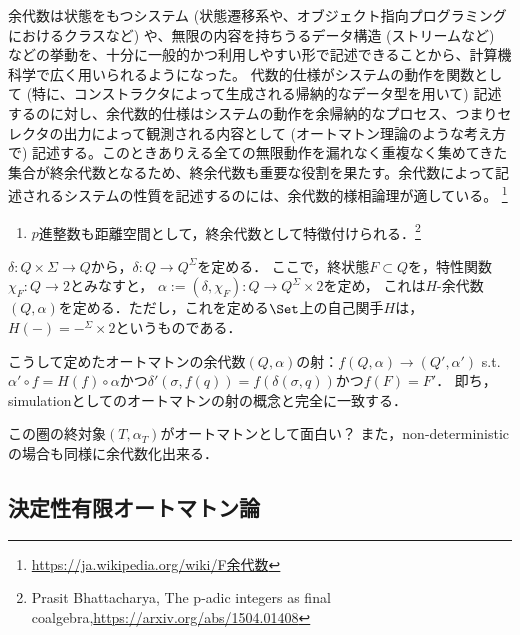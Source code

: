 \begin{example}[余代数の例]
    余代数は状態をもつシステム (状態遷移系や、オブジェクト指向プログラミングにおけるクラスなど) や、無限の内容を持ちうるデータ構造 (ストリームなど) などの挙動を、十分に一般的かつ利用しやすい形で記述できることから、計算機科学で広く用いられるようになった。
    代数的仕様がシステムの動作を関数として (特に、コンストラクタによって生成される帰納的なデータ型を用いて) 記述するのに対し、余代数的仕様はシステムの動作を余帰納的なプロセス、つまりセレクタの出力によって観測される内容として (オートマトン理論のような考え方で) 記述する。このときありえる全ての無限動作を漏れなく重複なく集めてきた集合が終余代数となるため、終余代数も重要な役割を果たす。余代数によって記述されるシステムの性質を記述するのには、余代数的様相論理が適している。 
    \footnote{\url{https://ja.wikipedia.org/wiki/F余代数}}
    \begin{enumerate}
        \item $p$進整数も距離空間として，終余代数として特徴付けられる．\footnote{Prasit Bhattacharya, The p-adic integers as final coalgebra,\url{https://arxiv.org/abs/1504.01408}}
    \end{enumerate}
\end{example}

\begin{definition}
    $\delta:Q\times\Sigma\to Q$から，$\delta:Q\to Q^\Sigma$を定める．
    ここで，終状態$F\subset Q$を，特性関数$\chi_F:Q\to 2$とみなすと，
    $\alpha:=(\delta,\chi_F):Q\to Q^\Sigma\times 2$を定め，
    これは$H$-余代数$(Q,\alpha)$を定める．ただし，これを定める$\Set$上の自己関手$H$は，$H(-)=-^\Sigma\times 2$というものである．
\end{definition}
\begin{remark}[２つの定義の等価性]
    こうして定めたオートマトンの余代数$(Q,\alpha)$の射：$f(Q,\alpha)\to(Q',\alpha')$ s.t. $\alpha'\circ f=H(f)\circ\alpha$かつ$\delta'(\sigma,f(q))=f(\delta(\sigma,q))$かつ$f(F)=F'$．
    即ち，simulationとしてのオートマトンの射の概念と完全に一致する．
\end{remark}

この圏の終対象$(T,\alpha_T)$がオートマトンとして面白い？
また，non-deterministicの場合も同様に余代数化出来る．

\subsection{決定性有限オートマトン論}

